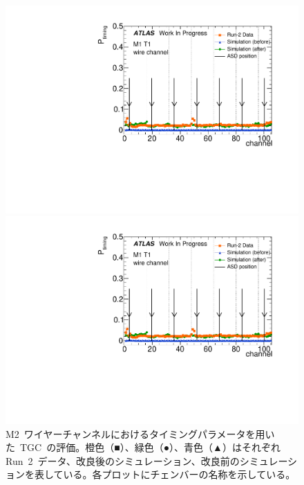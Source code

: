 \begin{figure}[htbp]
\begin{minipage}{0.49\hsize}
		\includegraphics[width=\textwidth,page=20]{img/pdf5/master_timingplot_comp.pdf}
		\end{minipage}
		\begin{minipage}{0.49\hsize}
		\centering
		\includegraphics[width=\textwidth,page=22]{img/pdf5/master_timingplot_comp.pdf}
		\end{minipage}
		\caption[M2~ワイヤーチャンネルにおけるタイミングパラメータを用いた~TGC~の評価。]{M2~ワイヤーチャンネルにおけるタイミングパラメータを用いた~TGC~の評価。橙色（■）、緑色（●）、青色（▲）はそれぞれRun~2~データ、改良後のシミュレーション、改良前のシミュレーションを表している。各プロットにチェンバーの名称を示している。}
		\label{fig:timingPlotCompWireM2}
	\end{figure}
